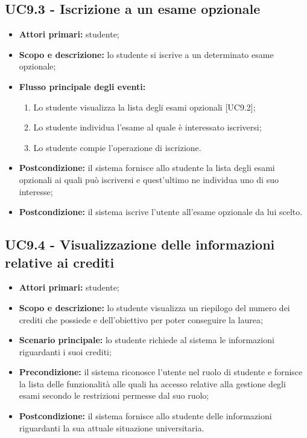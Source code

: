 \documentclass[AnalisiDeiRequisiti.tex]{subfiles}
\begin{document}
\subsection{UC9.3 - Iscrizione a un esame opzionale}
\begin{itemize}
	\item \textbf{Attori primari:} studente;
	\item \textbf{Scopo e descrizione:} lo studente si iscrive a un determinato esame opzionale;
	\item \textbf{Flusso principale degli eventi:}
	\begin{enumerate}
		\item Lo studente visualizza la lista degli esami opzionali [UC9.2];
		\item Lo studente individua l'esame al quale è interessato iscriversi;
		\item Lo studente compie l'operazione di iscrizione.
	\end{enumerate}
	\item \textbf{Postcondizione:} il sistema fornisce allo studente la lista degli esami opzionali ai quali può iscriversi e quest'ultimo ne individua uno di suo interesse;
	\item \textbf{Postcondizione:} il sistema iscrive l'utente all'esame opzionale da lui scelto.
\end{itemize}

\subsection{UC9.4 - Visualizzazione delle informazioni relative ai crediti}
\begin{itemize}
	\item \textbf{Attori primari:} studente;
	\item \textbf{Scopo e descrizione:} lo studente visualizza un riepilogo del numero dei crediti che possiede e dell'obiettivo per poter conseguire la laurea;
	\item \textbf{Scenario principale:} lo studente richiede al sistema le informazioni riguardanti i suoi crediti;
	\item \textbf{Precondizione:} il sistema riconosce l'utente nel ruolo di studente e fornisce la lista delle funzionalità alle quali ha accesso relative alla gestione degli esami secondo le restrizioni permesse dal suo ruolo; 
	\item \textbf{Postcondizione:} il sistema fornisce allo studente delle informazioni riguardanti la sua attuale situazione universitaria.
\end{itemize}
\end{document}
